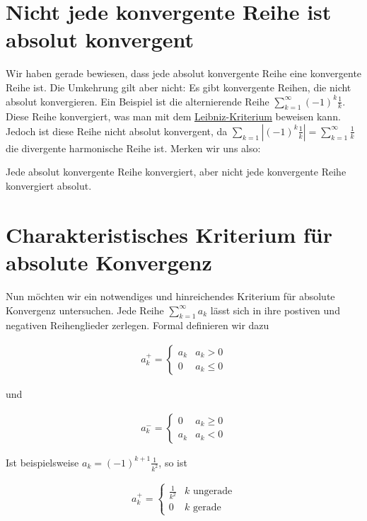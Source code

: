 \documentclass[fontsize=9pt,
               parskip=half-,
               DIV=14,
               listof=chapterentry,
               tocflat]{scrbook}
\begin{document}
\section{Nicht jede konvergente Reihe ist absolut konvergent}

Wir haben gerade bewiesen, dass jede absolut konvergente Reihe eine konvergente Reihe ist. Die Umkehrung gilt aber nicht: Es gibt konvergente Reihen, die nicht absolut konvergieren. Ein Beispiel ist die alternierende Reihe $\sum _{k=1}^{\infty }(-1)^{k}{\frac {1}{k}}$. Diese Reihe konvergiert, was man mit dem \href{https://de.wikibooks.org/wiki/Mathe\_für\_Nicht-Freaks:\_Leibniz-Kriterium}
{Leibniz-Kriterium} beweisen kann. Jedoch ist diese Reihe nicht absolut konvergent, da $\sum _{k=1}\left|(-1)^{k}{\frac {1}{k}}\right|=\sum _{k=1}^{\infty }{\frac {1}{k}}$ die divergente harmonische Reihe ist. Merken wir uns also:

\begin{importantparagraph*}
Jede absolut konvergente Reihe konvergiert, aber nicht jede konvergente Reihe konvergiert absolut.

\end{importantparagraph*}

\section{Charakteristisches Kriterium für absolute Konvergenz}

Nun möchten wir ein notwendiges und hinreichendes Kriterium für absolute Konvergenz untersuchen. Jede Reihe $\sum _{k=1}^{\infty }a_{k}$ lässt sich in ihre postiven und negativen Reihenglieder zerlegen. Formal definieren wir dazu

\begin{align*}
a_{k}^{+}={\begin{cases}a_{k}&a_{k}>0\\0&a_{k}\leq 0\end{cases}}
\end{align*}

und

\begin{align*}
a_{k}^{-}={\begin{cases}0&a_{k}\geq 0\\a_{k}&a_{k}<0\end{cases}}
\end{align*}

Ist beispielsweise $a_{k}=(-1)^{k+1}{\tfrac {1}{k^{2}}}$, so ist

\begin{align*}
a_{k}^{+}={\begin{cases}{\frac {1}{k^{2}}}&k{\text{ ungerade}}\\0&k{\text{ gerade}}\end{cases}}
\end{align*}
\end{document}
